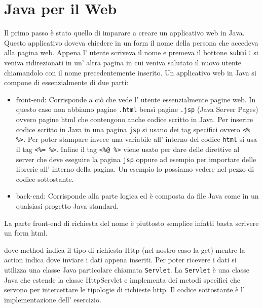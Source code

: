 \documentclass[12pt]{book}
\begin{document}
\section{Java per il Web}
Il primo passo è stato quello di imparare a creare un applicativo web in Java.
Questo applicativo doveva chiedere in un form il nome della persona che accedeva
alla pagina web.
Appena l' utente scriveva il nome e premeva il bottone \texttt{submit} si veniva
ridirezionati in un' altra pagina in cui veniva salutato il nuovo utente 
chiamandolo con il nome precedentemente inserito.
Un applicativo web in Java si compone di essenzialmente di due parti:
\begin{itemize}
    \item front-end: Corrisponde a ciò che vede l' utente essenzialmente pagine
        web. In questo caso non abbiamo pagine \texttt{.html}
        bensì pagine \texttt{.jsp} (Java Server Pages) ovvero pagine html che 
        contengono anche codice scritto in Java.
        Per inserire codice scritto in Java in una pagina \texttt{jsp} si 
        usano dei tag specifici ovvero \texttt{<\%  \%>}.
        Per poter stampare invece una variabile all' interno del codice 
        \texttt{html} si usa il tag \texttt{<\%= \%>}.
        Infine il tag \texttt{<\%@ \%>} viene usato per dare delle direttive al server
        che deve eseguire la pagina \texttt{jsp} oppure ad esempio per importare
        delle librerie all' interno della pagina.
        Un esempio lo possiamo vedere nel pezzo di codice sottostante.
        
    \item back-end: Corrisponde alla parte logica ed è composta da file Java 
        come in un qualsiasi progetto Java standard.
\end{itemize}
La parte front-end di richiesta del nome è piuttosto semplice infatti basta 
scrivere un form html.

dove method indica il tipo di richiesta Http (nel nostro caso la get) mentre
la action indica dove inviare i dati appena inseriti.
Per poter ricevere i dati si utilizza una classe Java particolare chiamata
\texttt{Servlet}.
La \texttt{Servlet} è una classe Java che estende la classe HttpServlet e implementa 
dei metodi specifici che servono per intercettare le tipologie di richieste 
http.
Il codice sottostante è l' implementazione dell' esercizio.

\end{document}
